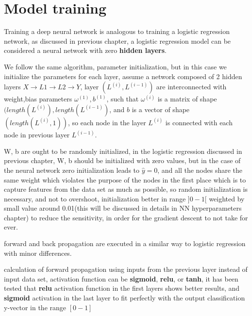 \documentclass[4apaper,12pt]{book}
\begin{document}
\section{Model training}
\begin{description}
\item Training a deep neural network is analogous to training a logistic regression network, as discussed in previous chapter, a logistic regression model can be considered a neural network with zero \textbf{hidden layers}.
\item We follow the same algorithm, parameter initialization, but in this case we initialize the parameters for each layer, assume a network composed of 2 hidden layers $X \rightarrow L1 \rightarrow L2 \rightarrow Y$, layer $(L^{(i)}, L^{(i-1)})$ are interconnected with weight,bias parameters $\omega^{(1)},b^{(1)}$, such that $\omega^{(i)}$ is a matrix of shape $(length(L^{(i)}), length(L^{(i-1)})$, and $b$ is a vector of shape $(length(L^{(i)}, 1))$, so each node in the layer $L^{(i)}$ is connected with each node in previous layer $L^{(i-1)}$.
\item W, b are ought to be randomly initialized, in the logistic regression discussed in previous chapter, W, b should be initialized with zero values, but in the case of the neural network zero initialization leads to $\hat{y}=0$, and all the nodes share the same weight which violates the purpose of the nodes in the first place which is to capture features from the data set as much as possible, so random initialization is necessary, and not to overshoot, initialization better in range $]0-1[$ weighted by small value around 0.01(this will be discussed in details in NN hyperparameters chapter) to reduce the sensitivity, in order for the gradient descent to not take for ever.
  \item forward and back propagation are executed in a similar way to logistic regression with minor differences.
  \item calculation of forward propagation using inputs from the previous layer instead of input data set, activation function can be \textbf{sigmoid}, \textbf{relu}, or \textbf{tanh}, it has been tested that \textbf{relu} activation function in the first layers shows better results, and \textbf{sigmoid} activation in the last layer to fit perfectly with the output classification y-vector in the range $[0-1]$

\end{description}
\end{document}
